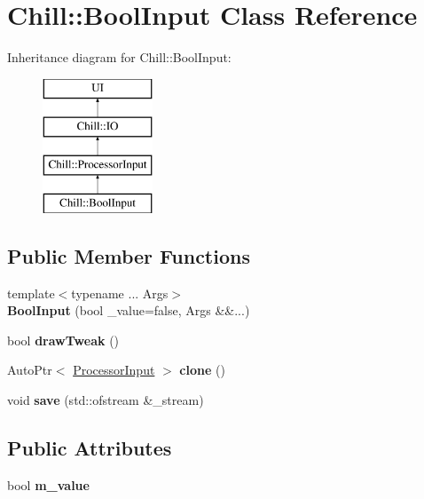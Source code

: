 \hypertarget{class_chill_1_1_bool_input}{}\section{Chill\+:\+:Bool\+Input Class Reference}
\label{class_chill_1_1_bool_input}
Inheritance diagram for Chill\+:\+:Bool\+Input\+:\begin{figure}[H]
\begin{center}
\leavevmode
\includegraphics[height=4.000000cm]{class_chill_1_1_bool_input}
\end{center}
\end{figure}
\subsection*{Public Member Functions}
\begin{DoxyCompactItemize}
\item 
\mbox{\label{class_chill_1_1_bool_input_aae2e8cc8286c1bc2e1a86d2a1df1b8e3}} 
{\footnotesize template$<$typename ... Args$>$ }\\{\bfseries Bool\+Input} (bool \+\_\+value=false, Args \&\&...)
\item 
\mbox{\label{class_chill_1_1_bool_input_a3fbc0d1f7a014f66a3e2694e9a504a9a}} 
bool {\bfseries draw\+Tweak} ()
\item 
\mbox{\label{class_chill_1_1_bool_input_a476fbe3663b4dd60bbc212ab64aeb4b5}} 
Auto\+Ptr$<$ \mbox{\hyperlink{class_chill_1_1_processor_input}{Processor\+Input}} $>$ {\bfseries clone} ()
\item 
\mbox{\label{class_chill_1_1_bool_input_ad8c8c597733d4d53a38005fa852090e4}} 
void {\bfseries save} (std\+::ofstream \&\+\_\+stream)
\end{DoxyCompactItemize}
\subsection*{Public Attributes}
\begin{DoxyCompactItemize}
\item 
\mbox{\label{class_chill_1_1_bool_input_a2942d4164fe50893e591a3799db34dc5}} 
bool {\bfseries m\+\_\+value}
\end{DoxyCompactItemize}
